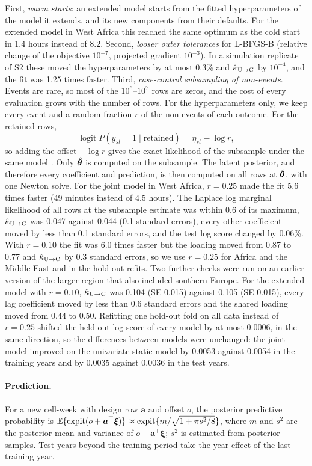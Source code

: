 First, \emph{warm starts}: an extended model starts from the fitted hyperparameters of
the model it extends, and its new components from their defaults. For the extended
model in West Africa this reached the same optimum as the cold start in 1.4 hours
instead of 8.2. Second, \emph{looser outer tolerances} for L-BFGS-B (relative change
of the objective $10^{-7}$, projected gradient $10^{-3}$). In a simulation replicate of
S2 these moved the hyperparameters by at most 0.3\% and $\hat\kappa_{\mathrm{U}\to\mathrm{C}}$ by $10^{-4}$, and
the fit was 1.25 times faster. Third, \emph{case-control subsampling of
non-events}. Events are rare, so most of the $10^6$--$10^7$ rows are zeros, and the
cost of every evaluation grows with the number of rows. For the hyperparameters only,
we keep every event and a random fraction $r$ of the non-events of each outcome. For
the retained rows,
\[
\operatorname{logit} P(y_{st} = 1 \mid \text{retained}) = \eta_{st} - \log r,
\]
so adding the offset $-\log r$ gives the exact likelihood of the subsample under the
same model \citep{prentice1979logistic}. Only $\hat{\bm{\theta}}$ is computed on the
subsample. The latent posterior, and therefore every coefficient and prediction, is
then computed on all rows at $\hat{\bm{\theta}}$, with one Newton solve. For the joint model
in West Africa, $r = 0.25$ made the fit 5.6 times faster (49 minutes instead of 4.5
hours). The Laplace log marginal likelihood of all rows at the subsample estimate was
within 0.6 of its maximum, $\hat\kappa_{\mathrm{U}\to\mathrm{C}}$ was 0.047 against 0.044 (0.1 standard errors),
every other coefficient moved by less than 0.1 standard errors, and the test log score
changed by 0.06\%. With $r = 0.10$ the fit was 6.0 times faster but the loading moved
from 0.87 to 0.77 and $\hat\kappa_{\mathrm{U}\to\mathrm{C}}$ by 0.3 standard errors, so we use $r = 0.25$ for Africa and the Middle East and
in the hold-out refits. Two further checks were run on an earlier version of the
larger region that also included southern Europe. For the extended model with
$r = 0.10$, $\hat\kappa_{\mathrm{U}\to\mathrm{C}}$ was 0.104 (SE 0.015) against 0.105 (SE 0.015), every lag
coefficient moved by less than 0.6 standard errors and the shared loading moved from
0.44 to 0.50. Refitting one hold-out fold on all data instead of $r = 0.25$ shifted the
held-out log score of every model by at most 0.0006, in the same direction, so the
differences between models were unchanged: the joint model improved on the univariate
static model by 0.0053 against 0.0054 in the training years and by 0.0035 against
0.0036 in the test years.

\paragraph{Prediction.} For a new cell-week with design row $\bm{a}$ and
offset $o$, the posterior predictive probability is
$\mathbb{E}\{\operatorname{expit}(o + \bm{a}^\top\bm{\xi})\} \approx \operatorname{expit}\{m/\sqrt{1 + \pi s^2/8}\}$, where
$m$ and $s^2$ are the posterior mean and variance of $o + \bm{a}^\top\bm{\xi}$; $s^2$
is estimated from posterior samples. Test years beyond the training period take the
year effect of the last training year.

